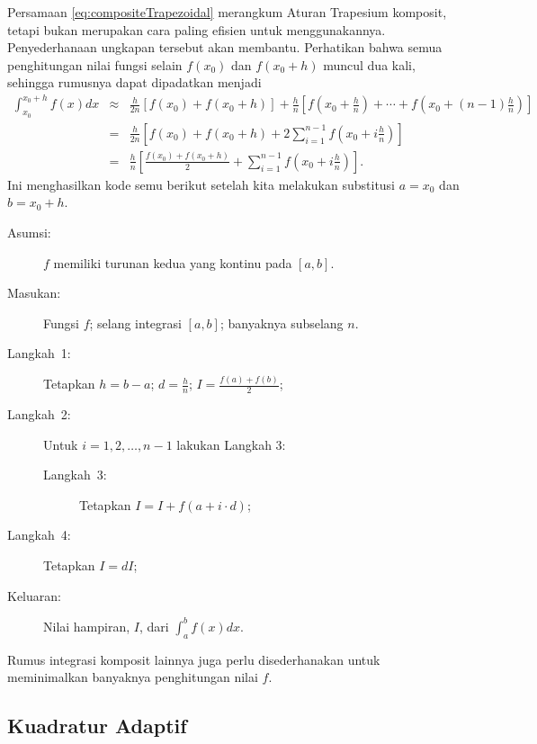 Persamaan \ref{eq:compositeTrapezoidal} merangkum Aturan Trapesium
komposit, tetapi bukan merupakan cara paling efisien untuk menggunakannya.
Penyederhanaan ungkapan tersebut akan membantu. Perhatikan bahwa semua
penghitungan nilai fungsi selain $f(x_{0})$ dan $f(x_{0}+h)$ muncul
dua kali, sehingga rumusnya dapat dipadatkan menjadi
\begin{eqnarray*}
\int_{x_{0}}^{x_{0}+h}f(x)dx & \approx & \frac{h}{2n}\left[f(x_{0})+f(x_{0}+h)\right]+\frac{h}{n}\left[f\left(x_{0}+\frac{h}{n}\right)+\cdots+f\left(x_{0}+(n-1)\frac{h}{n}\right)\right]\\
 & = & \frac{h}{2n}\left[f(x_{0})+f(x_{0}+h)+2\sum_{i=1}^{n-1}f\left(x_{0}+i\frac{h}{n}\right)\right]\\
 & = & \frac{h}{n}\left[\frac{f(x_{0})+f(x_{0}+h)}{2}+\sum_{i=1}^{n-1}f\left(x_{0}+i\frac{h}{n}\right)\right].
\end{eqnarray*}
Ini menghasilkan kode semu berikut setelah kita melakukan substitusi
$a=x_{0}$ dan $b=x_{0}+h$.

\noindent\begin{pseudocode} 
\begin{description}
\item [{Asumsi:}] $f$ memiliki turunan kedua yang kontinu pada $[a,b]$.
\item [{Masukan:}] Fungsi $f$; selang integrasi $[a,b]$; banyaknya subselang
$n$.
\item [{Langkah~1:}] Tetapkan $h=b-a$; $d=\frac{h}{n}$; $I=\frac{f(a)+f(b)}{2}$;
\item [{Langkah~2:}] Untuk $i=1,2,\ldots,n-1$ lakukan Langkah 3:

\begin{description}
\item [{Langkah~3:}] Tetapkan $I=I+f(a+i\cdot d)$;
\end{description}
\item [{Langkah~4:}] Tetapkan $I=dI$;
\item [{Keluaran:}] Nilai hampiran, $I$, dari $\int_{a}^{b}f(x)dx$.
\end{description}
\end{pseudocode} 

\noindent Rumus integrasi komposit lainnya juga perlu disederhanakan
untuk meminimalkan banyaknya penghitungan nilai $f$.

\subsection{Kuadratur Adaptif}

